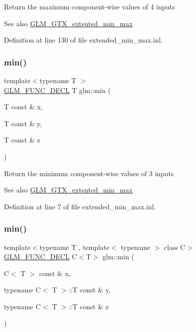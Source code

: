 Return the maximum component-\/wise values of 4 inputs \begin{DoxySeeAlso}{See also}
\mbox{\hyperlink{group__gtx__extented__min__max}{G\+L\+M\+\_\+\+G\+T\+X\+\_\+extented\+\_\+min\+\_\+max}} 
\end{DoxySeeAlso}


Definition at line 130 of file extended\+\_\+min\+\_\+max.\+inl.

\mbox{\label{group__gtx__extented__min__max_ga713d3f9b3e76312c0d314e0c8611a6a6}} 
\subsubsection{\texorpdfstring{min()}{min()}\hspace{0.1cm}{\footnotesize\ttfamily [1/6]}}
{\footnotesize\ttfamily template$<$typename T $>$ \\
\mbox{\hyperlink{setup_8hpp_ab2d052de21a70539923e9bcbf6e83a51}{G\+L\+M\+\_\+\+F\+U\+N\+C\+\_\+\+D\+E\+CL}} T glm\+::min (\begin{DoxyParamCaption}\item[{T const \&}]{x,  }\item[{T const \&}]{y,  }\item[{T const \&}]{z }\end{DoxyParamCaption})}

Return the minimum component-\/wise values of 3 inputs \begin{DoxySeeAlso}{See also}
\mbox{\hyperlink{group__gtx__extented__min__max}{G\+L\+M\+\_\+\+G\+T\+X\+\_\+extented\+\_\+min\+\_\+max}} 
\end{DoxySeeAlso}


Definition at line 7 of file extended\+\_\+min\+\_\+max.\+inl.

\mbox{\label{group__gtx__extented__min__max_ga74d1a96e7cdbac40f6d35142d3bcbbd4}} 
\subsubsection{\texorpdfstring{min()}{min()}\hspace{0.1cm}{\footnotesize\ttfamily [2/6]}}
{\footnotesize\ttfamily template$<$typename T , template$<$ typename $>$ class C$>$ \\
\mbox{\hyperlink{setup_8hpp_ab2d052de21a70539923e9bcbf6e83a51}{G\+L\+M\+\_\+\+F\+U\+N\+C\+\_\+\+D\+E\+CL}} C$<$T$>$ glm\+::min (\begin{DoxyParamCaption}\item[{C$<$ T $>$ const \&}]{x,  }\item[{typename C$<$ T $>$\+::T const \&}]{y,  }\item[{typename C$<$ T $>$\+::T const \&}]{z }\end{DoxyParamCaption})}


